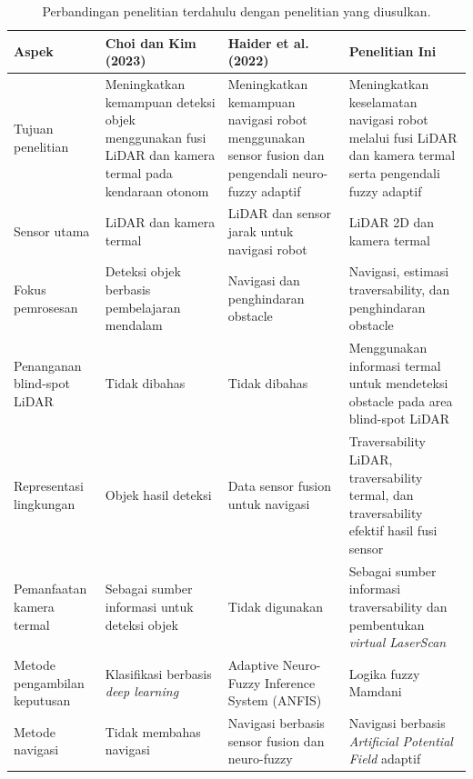 \begin{table}[H]
\centering
\scriptsize
\caption{Perbandingan penelitian terdahulu dengan penelitian yang diusulkan.}
\label{tab:penelitian_terdahulu}
\renewcommand{\arraystretch}{1.0}
\setlength{\tabcolsep}{3pt}

\begin{tabularx}{0.95\textwidth}{|>{\raggedright\arraybackslash}p{2.1cm}|X|X|X|}
\hline
\textbf{Aspek} &
\textbf{Choi dan Kim (2023)} &
\textbf{Haider et al. (2022)} &
\textbf{Penelitian Ini} \\
\hline

Tujuan penelitian &
Meningkatkan kemampuan deteksi objek menggunakan fusi LiDAR dan kamera termal pada kendaraan otonom &
Meningkatkan kemampuan navigasi robot menggunakan sensor fusion dan pengendali neuro-fuzzy adaptif &
Meningkatkan keselamatan navigasi robot melalui fusi LiDAR dan kamera termal serta pengendali fuzzy adaptif \\
\hline

Sensor utama &
LiDAR dan kamera termal &
LiDAR dan sensor jarak untuk navigasi robot &
LiDAR 2D dan kamera termal \\
\hline

Fokus pemrosesan &
Deteksi objek berbasis pembelajaran mendalam &
Navigasi dan penghindaran obstacle &
Navigasi, estimasi traversability, dan penghindaran obstacle \\
\hline

Penanganan blind-spot LiDAR &
Tidak dibahas &
Tidak dibahas &
Menggunakan informasi termal untuk mendeteksi obstacle pada area blind-spot LiDAR \\
\hline

Representasi lingkungan &
Objek hasil deteksi &
Data sensor fusion untuk navigasi &
Traversability LiDAR, traversability termal, dan traversability efektif hasil fusi sensor \\
\hline

Pemanfaatan kamera termal &
Sebagai sumber informasi untuk deteksi objek &
Tidak digunakan &
Sebagai sumber informasi traversability dan pembentukan \textit{virtual LaserScan} \\
\hline

Metode pengambilan keputusan &
Klasifikasi berbasis \textit{deep learning} &
Adaptive Neuro-Fuzzy Inference System (ANFIS) &
Logika fuzzy Mamdani \\
\hline

Metode navigasi &
Tidak membahas navigasi &
Navigasi berbasis sensor fusion dan neuro-fuzzy &
Navigasi berbasis \textit{Artificial Pot\-ential Field} adaptif \\
\hline


\end{tabularx}
\end{table}
